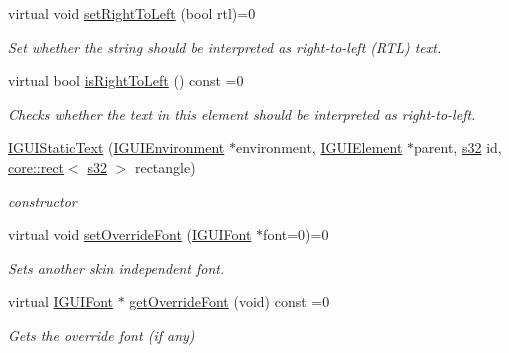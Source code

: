 \begin{DoxyCompactItemize}
virtual void \hyperlink{classirr_1_1gui_1_1IGUIStaticText_a43cee247cf34faa30851f4e8c10b2367}{set\+Right\+To\+Left} (bool rtl)=0
\begin{DoxyCompactList}\small\item\em Set whether the string should be interpreted as right-\/to-\/left (R\+TL) text. \end{DoxyCompactList}\item 
\mbox{\label{classirr_1_1gui_1_1IGUIStaticText_a750a43d48f16d0e89aa28a0175a06ff6}} 
virtual bool \hyperlink{classirr_1_1gui_1_1IGUIStaticText_a750a43d48f16d0e89aa28a0175a06ff6}{is\+Right\+To\+Left} () const =0
\begin{DoxyCompactList}\small\item\em Checks whether the text in this element should be interpreted as right-\/to-\/left. \end{DoxyCompactList}\item 
\mbox{\label{classirr_1_1gui_1_1IGUIStaticText_a80f93a4419ad85a0f9aadfbdd26aa87d}} 
\hyperlink{classirr_1_1gui_1_1IGUIStaticText_a80f93a4419ad85a0f9aadfbdd26aa87d}{I\+G\+U\+I\+Static\+Text} (\hyperlink{classirr_1_1gui_1_1IGUIEnvironment}{I\+G\+U\+I\+Environment} $\ast$environment, \hyperlink{classirr_1_1gui_1_1IGUIElement}{I\+G\+U\+I\+Element} $\ast$parent, \hyperlink{namespaceirr_ac66849b7a6ed16e30ebede579f9b47c6}{s32} id, \hyperlink{classirr_1_1core_1_1rect}{core\+::rect}$<$ \hyperlink{namespaceirr_ac66849b7a6ed16e30ebede579f9b47c6}{s32} $>$ rectangle)
\begin{DoxyCompactList}\small\item\em constructor \end{DoxyCompactList}\item 
virtual void \hyperlink{classirr_1_1gui_1_1IGUIStaticText_ae3f65780d10979eb323ee7310cff7396}{set\+Override\+Font} (\hyperlink{classirr_1_1gui_1_1IGUIFont}{I\+G\+U\+I\+Font} $\ast$font=0)=0
\begin{DoxyCompactList}\small\item\em Sets another skin independent font. \end{DoxyCompactList}\item 
virtual \hyperlink{classirr_1_1gui_1_1IGUIFont}{I\+G\+U\+I\+Font} $\ast$ \hyperlink{classirr_1_1gui_1_1IGUIStaticText_a581f18f3ffe650246125988b3b7dc44e}{get\+Override\+Font} (void) const =0
\begin{DoxyCompactList}\small\item\em Gets the override font (if any) \end{DoxyCompactList}\item 

\end{DoxyCompactItemize}

